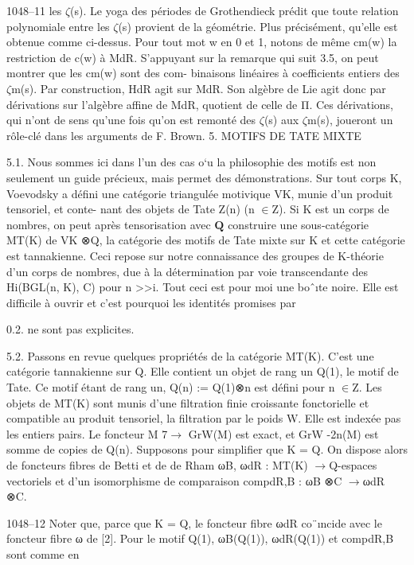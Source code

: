 \documentclass[11pt]{article}
\begin{document}
1048--11 les \(\zeta\)(s). Le yoga des périodes de Grothendieck prédit que toute relation polynomiale entre les \(\zeta\)(s) provient de la géométrie. Plus précisément, qu’elle est obtenue comme ci-dessus. Pour tout mot w en 0 et 1, notons de même cm(w) la restriction de c(w) à MdR. S’appuyant sur la remarque qui suit 3.5, on peut montrer que les cm(w) sont des com- binaisons linéaires à coefficients entiers des \(\zeta\)m(s). Par construction, HdR agit sur MdR. Son algèbre de Lie agit donc par dérivations sur l’algèbre affine de MdR, quotient de celle de Π. Ces dérivations, qui n’ont de sens qu’une fois qu’on est remonté des \(\zeta\)(s) aux \(\zeta\)m(s), joueront un rôle-clé dans les arguments de F. Brown. 5. MOTIFS DE TATE MIXTE 

5.1. Nous sommes ici dans l’un des cas o`u la philosophie des motifs est non seulement un guide précieux, mais permet des démonstrations. Sur tout corps K, Voevodsky a défini une catégorie triangulée motivique VK, munie d’un produit tensoriel, et conte- nant des objets de Tate Z(n) (n \(\in\)Z). Si K est un corps de nombres, on peut après tensorisation avec \(\mathbf Q\) construire une sous-catégorie MT(K) de VK ⊗Q, la catégorie des motifs de Tate mixte sur K et cette catégorie est tannakienne. Ceci repose sur notre connaissance des groupes de K-théorie d’un corps de nombres, due à la détermination par voie transcendante des Hi(BGL(n, K), C) pour n >>i. Tout ceci est pour moi une boˆıte noire. Elle est difficile à ouvrir et c’est pourquoi les identités promises par 

0.2. ne sont pas explicites. 

5.2. Passons en revue quelques propriétés de la catégorie MT(K). C’est une catégorie tannakienne sur Q. Elle contient un objet de rang un Q(1), le motif de Tate. Ce motif étant de rang un, Q(n) := Q(1)⊗n est défini pour n \(\in\)Z. Les objets de MT(K) sont munis d’une filtration finie croissante fonctorielle et compatible au produit tensoriel, la filtration par le poids W. Elle est indexée pas les entiers pairs. Le foncteur M 7\(\to\) GrW(M) est exact, et GrW -2n(M) est somme de copies de Q(n). Supposons pour simplifier que K = Q. On dispose alors de foncteurs fibres de Betti et de de Rham ωB, ωdR : MT(K) \(\to\)Q-espaces vectoriels et d’un isomorphisme de comparaison compdR,B : ωB ⊗C \(\to\)ωdR ⊗C.

1048--12 Noter que, parce que K = Q, le foncteur fibre ωdR co¨ıncide avec le foncteur fibre ω de [2]. Pour le motif Q(1), ωB(Q(1)), ωdR(Q(1)) et compdR,B sont comme en 
\end{document}
